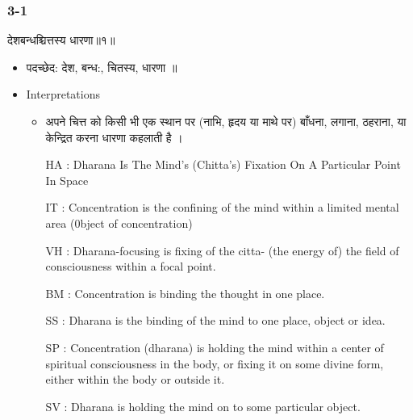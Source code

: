 \begin{frame}[fragile]\frametitle{3-1}
\begin{sanskrit}
देशबन्धश्चित्तस्य धारणा॥१॥
\end{sanskrit}

	\begin{itemize}
	\item पदच्छेद: देश, बन्ध:, चितस्य‌, धारणा ‌॥
	\item Interpretations
		\begin{itemize}	
		\item अपने चित्त को किसी भी एक स्थान पर (नाभि, हृदय या माथे पर) बाँधना, लगाना, ठहराना, या केन्द्रित करना धारणा कहलाती है ।
		\item [HA]: Dharana Is The Mind’s (Chitta’s) Fixation On A Particular Point In Space
		\item [IT]: Concentration is the confining of the mind within a limited mental area (0bject of concentration)
		\item [VH]: Dharana-focusing is fixing of the citta- (the energy of) the field of consciousness within a focal point.
		\item [BM]: Concentration is binding the thought in one place.
		\item [SS]: Dharana is the binding of the mind to one place, object or idea.
		\item [SP]: Concentration (dharana) is holding the mind within a center of spiritual consciousness in the body, or fixing it on some divine form, either within the body or outside it.
		\item [SV]: Dharana is holding the mind on to some particular object. 
		\end{itemize}
	\end{itemize}
\end{frame}

